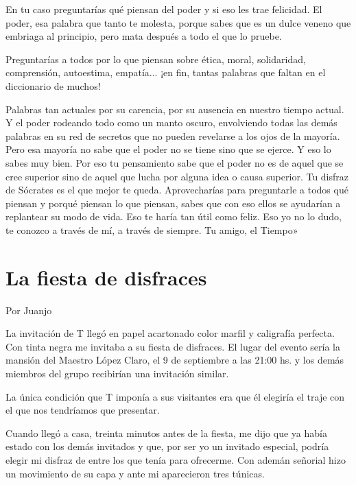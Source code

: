 \documentclass[11pt,twoside,openright,a5paper]{book}
\begin{document}
En tu caso preguntarías qué piensan del poder y si eso les trae felicidad. El poder, esa palabra que tanto te molesta, porque sabes que es un dulce veneno que embriaga al principio, pero mata después a todo el que lo pruebe.

Preguntarías a todos por lo que piensan sobre ética, moral, solidaridad, comprensión, autoestima, empatía... ¡en fin, tantas palabras que faltan en el diccionario de muchos! 

Palabras tan actuales por su carencia, por su ausencia en nuestro tiempo actual. Y el poder rodeando todo como un manto oscuro, envolviendo todas las demás palabras en su red de secretos que no pueden revelarse a los ojos de la mayoría. Pero esa mayoría no sabe que el poder no se tiene sino que se ejerce. Y eso lo sabes muy bien. Por eso tu pensamiento sabe que el poder no es de aquel que se cree superior sino de aquel que lucha por alguna idea o causa superior. Tu disfraz de Sócrates es el que mejor te queda. Aprovecharías para preguntarle a todos qué piensan y porqué piensan lo que piensan, sabes que con eso ellos se ayudarían a replantear  su modo de vida. Eso te haría tan útil como feliz.  Eso yo no lo dudo, te conozco a través de mí, a través de  siempre. Tu amigo, el Tiempo»

\section*{La fiesta de disfraces}
                                                                                    \begin{flushright}Por Juanjo\end{flushright}

La invitación de T llegó en papel acartonado color marfil y caligrafía perfecta. Con tinta negra me invitaba a su fiesta de disfraces. El lugar del evento sería la mansión del Maestro López Claro, el 9 de septiembre a las 21:00 hs. y los demás miembros del grupo recibirían una invitación similar.

La única condición que T imponía a sus visitantes era que él elegiría el traje con el que nos tendríamos que presentar.

Cuando llegó a casa, treinta minutos antes de la fiesta, me dijo que ya había estado con los demás invitados y que, por ser yo un invitado especial, podría elegir mi disfraz de entre los que tenía para ofrecerme. Con ademán señorial hizo un movimiento de su capa y ante mi aparecieron tres túnicas.
\end{document}

